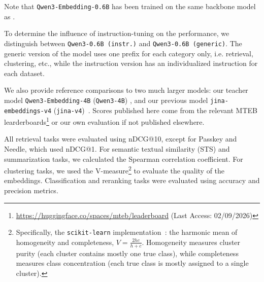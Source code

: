 \documentclass[11pt]{article}
\begin{document}
Note that \texttt{Qwen3-Embedding-0.6B} has been trained on the same backbone model as \JEmbeddingVFiveTextSmall{}. 

To determine the influence of instruction-tuning on the performance, we distinguish between \texttt{Qwen3-0.6B (instr.)} and \texttt{Qwen3-0.6B (generic)}. The generic version of the model uses one prefix for each category only, i.e. retrieval, clustering, etc., while the instruction version has an individualized instruction for each dataset. 

We also provide reference comparisons to two much larger models: our teacher model \texttt{Qwen3-Embedding-4B} (\texttt{Qwen3-4B}) \cite{zhang2025qwen3}, and our previous model \texttt{jina-embeddings-v4} (\texttt{jina-v4})~\cite{gunther2025jina}.
Scores published here come from the relevant MTEB learderboards\footnote{\url{https://huggingface.co/spaces/mteb/leaderboard} \tiny{(Last Access: 02/09/2026)}} or our own evaluation if not published elsewhere.

All retrieval tasks were evaluated using nDCG@10, except for Passkey and Needle, which used nDCG@1.
For semantic textual similarity (STS) and summarization tasks, we calculated the Spearman correlation coefficient. 
For clustering tasks, we used the V-measure\footnote{Specifically, the \texttt{scikit-learn} implementation~\cite{pedregosa2011scikit}:  the harmonic mean of homogeneity and completeness, $V = \frac{2hc}{h+c}$. Homogeneity measures cluster purity (each cluster contains mostly one true class), while completeness measures class concentration (each true class is mostly assigned to a single cluster).
} to evaluate the quality of the embeddings.
Classification and reranking tasks were evaluated using accuracy and precision metrics.
\end{document}
